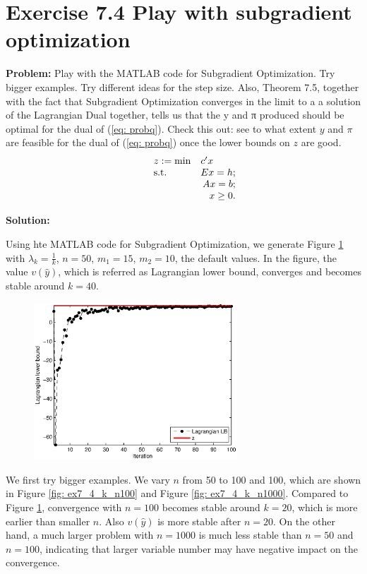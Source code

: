 \section{Exercise 7.4 Play with subgradient optimization}
\textbf{Problem:} Play with the MATLAB code for Subgradient Optimization. Try bigger examples. Try different ideas for the step size. Also, Theorem 7.5, together with the fact that Subgradient Optimization converges in the limit to a a solution of the Lagrangian Dual together, tells us that the y and π produced should be optimal for the dual of (\ref{eq: probq}). Check this out: see to what extent $y$ and $\pi$ are feasible for the dual of (\ref{eq: probq}) once the lower bounds on $z$ are good.
\begin{equation}
\label{eq: probq}
  \begin{array}{lrcll}
    z:=\min
    & \multicolumn{4}{l}{c'x} \\
    \text{s.t.}
    & Ex=h;\\
    & Ax=b;\\
    & x\geq0.
  \end{array}
\end{equation}

\textbf{Solution:} 

Using hte MATLAB code for Subgradient Optimization, we generate Figure \ref{fig: ex7_4_k} with $\lambda_k=\frac{1}{k}$, $n=50$, $m_1=15$, $m_2=10$, the default values. In the figure, the value $v(\widehat{y})$, which is referred as Lagrangian lower bound, converges and becomes stable around $k=40$.
 
\begin{figure}[h]
\centering
\includegraphics[width=3.0in]{./p4/ex7_4_k}
\label{fig: ex7_4_k}
\end{figure}

We first try bigger examples. We vary $n$ from 50 to 100 and 100, which are shown in Figure \ref{fig: ex7_4_k_n100} and Figure \ref{fig: ex7_4_k_n1000}. Compared to  Figure \ref{fig: ex7_4_k},  convergence with $n=100$ becomes stable around $k=20$, which is more earlier than smaller $n$. Also $v(\widehat{y})$ is more stable after $n=20$. On the other hand, a much larger problem with $n=1000$ is much less stable than $n=50$ and $n=100$, indicating that larger variable number may have negative impact on the convergence.  

